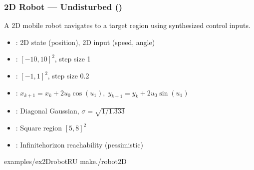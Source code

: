 \documentclass[a4paper,10pt,english]{sphinxmanual}
\let\sphinxpxdimen\pdfpxdimen\else\newdimen\sphinxpxdimen
\begin{document}
\subsubsection{2D Robot — Undisturbed ()}
\label{\detokenize{examples/reachability:d-robot-undisturbed-ex-2drobot-r-u}}
\sphinxAtStartPar
A 2D mobile robot navigates to a target region using synthesized control inputs.

\noindent{\hspace*{\fill}\sphinxincludegraphics[width=400\sphinxpxdimen]{{fig2}.png}\hspace*{\fill}}

\sphinxAtStartPar
{}
\begin{itemize}
\item {} 
\sphinxAtStartPar
{}: 2D state (position), 2D input (speed, angle)

\item {} 
\sphinxAtStartPar
{}: \([-10, 10]^2\), step size 1

\item {} 
\sphinxAtStartPar
{}: \([-1, 1]^2\), step size 0.2

\item {} 
\sphinxAtStartPar
{}: \(x_{k+1} = x_k + 2u_0 \cos(u_1),\; y_{k+1} = y_k + 2u_0 \sin(u_1)\)

\item {} 
\sphinxAtStartPar
{}: Diagonal Gaussian, \(\sigma = \sqrt{1/1.333}\)

\item {} 
\sphinxAtStartPar
{}: Square region \([5, 8]^2\)

\item {} 
\sphinxAtStartPar
{}: Infinite\sphinxhyphen{}horizon reachability (pessimistic)

\end{itemize}

\sphinxAtStartPar
{}

\begin{sphinxVerbatim}[commandchars=\\\{\}]
examples/ex\PYGZus{}2Drobot\PYGZhy{}R\PYGZhy{}U
make./robot2D
\end{sphinxVerbatim}
\end{document}
